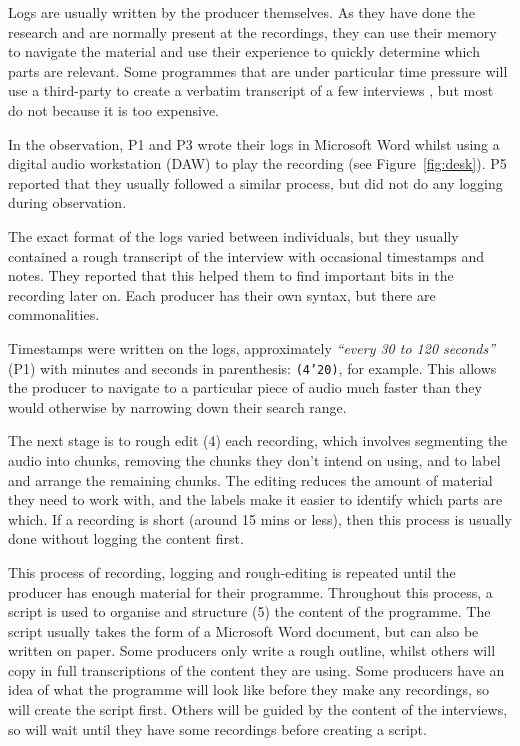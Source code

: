 Logs are usually written by the producer themselves. As they have done the research and are normally present at the
recordings, they can use their memory to navigate the material and use their experience to quickly determine which
parts are relevant. Some programmes that are under particular time pressure will use a third-party to create a verbatim
transcript of a few interviews \citep{Baume2015}, but most do not because it is too expensive.

In the observation, P1 and P3 wrote their logs in Microsoft Word whilst using a digital audio workstation (DAW) to play
the recording (see Figure~\ref{fig:desk}). P5 reported that they usually followed a similar process, but did not do any
logging during observation.

The exact format of the logs varied between individuals, but they usually contained a rough transcript of the interview
with occasional timestamps and notes. They reported that this helped them to find important bits in the recording later
on. Each producer has their own syntax, but there are commonalities.

Timestamps were written on the logs, approximately \textit{``every 30 to 120 seconds''} (P1) with minutes and seconds
in parenthesis: \texttt{(4'20)}, for example.  This allows the producer to navigate to a particular piece of audio much
faster than they would otherwise by narrowing down their search range.

The next stage is to rough edit (4) each recording, which involves segmenting the audio into chunks, removing the
chunks they don't intend on using, and to label and arrange the remaining chunks.  The editing reduces the amount of
material they need to work with, and the labels make it easier to identify which parts are which.  If a recording is
short (around 15 mins or less), then this process is usually done without logging the content first.

This process of recording, logging and rough-editing is repeated until the producer has enough material for their
programme. Throughout this process, a script is used to organise and structure (5) the content of the programme.  The
script usually takes the form of a Microsoft Word document, but can also be written on paper. Some producers only write a
rough outline, whilst others will copy in full transcriptions of the content they are using.  Some producers have an
idea of what the programme will look like before they make any recordings, so will create the script first. Others will
be guided by the content of the interviews, so will wait until they have some recordings before creating a script.

